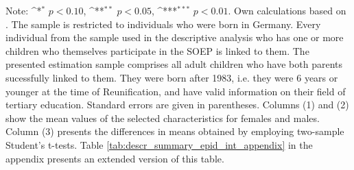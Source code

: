 \documentclass[a4paper, oneside, hyperfootnotes = false]{article}
\def\sym#1{\ifmmode^{#1}\else\(^{#1}\)\fi}
\begin{document}
{\begin{table}[ht]
\begin{center}
		\vspace{2mm}
		
		\parbox{10cm}{
			\linespread{1}\footnotesize Note: \sym{*} \(p<0.10\), \sym{**} \(p<0.05\), \sym{***} \(p<0.01\). Own calculations based on \cite{SOEP2023}. The sample is restricted to individuals who were born in Germany. Every individual from the sample used in the descriptive analysis who has one or more children who themselves participate in the SOEP is linked to them. The presented estimation sample comprises all adult children who have both parents sucessfully linked to them. They were born after 1983, i.e. they were 6 years or younger at the time of Reunification, and have valid information on their field of tertiary education. Standard errors are given in parentheses. Columns (1) and (2) show the mean values of the selected characteristics for females and males. Column (3) presents the differences in means obtained by employing two-sample Student's t-tests. Table \ref{tab:descr_summary_epid_int_appendix} in the appendix presents an extended version of this table.}
		
	\end{center}
\end{table}

}
\end{document}
